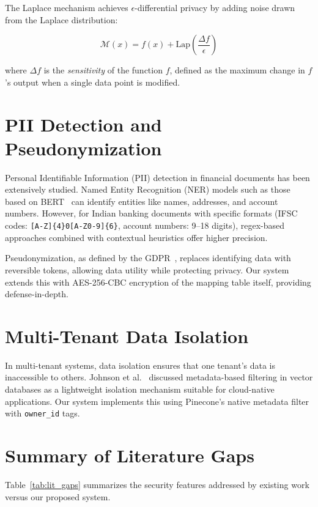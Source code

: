The Laplace mechanism achieves $\epsilon$-differential privacy by adding noise drawn from the Laplace distribution:

\begin{equation}
    \mathcal{M}(x) = f(x) + \text{Lap}\left(\frac{\Delta f}{\epsilon}\right)
\end{equation}

where $\Delta f$ is the \textit{sensitivity} of the function $f$, defined as the maximum change in $f$'s output when a single data point is modified.

\section{PII Detection and Pseudonymization}

Personal Identifiable Information (PII) detection in financial documents has been extensively studied. Named Entity Recognition (NER) models such as those based on BERT~\cite{devlin2019bert} can identify entities like names, addresses, and account numbers. However, for Indian banking documents with specific formats (IFSC codes: \texttt{[A-Z]\{4\}0[A-Z0-9]\{6\}}, account numbers: 9--18 digits), regex-based approaches combined with contextual heuristics offer higher precision.

Pseudonymization, as defined by the GDPR~\cite{gdpr2016}, replaces identifying data with reversible tokens, allowing data utility while protecting privacy. Our system extends this with AES-256-CBC encryption of the mapping table itself, providing defense-in-depth.

\section{Multi-Tenant Data Isolation}

In multi-tenant systems, data isolation ensures that one tenant's data is inaccessible to others. Johnson et al.~\cite{johnson2023vectordb} discussed metadata-based filtering in vector databases as a lightweight isolation mechanism suitable for cloud-native applications. Our system implements this using Pinecone's native metadata filter with \texttt{owner\_id} tags.

\section{Summary of Literature Gaps}

Table~\ref{tab:lit_gaps} summarizes the security features addressed by existing work versus our proposed system.

